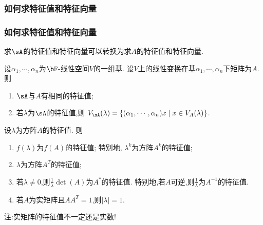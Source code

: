 \renewcommand{\mydate}{2025年05月15号\ 第二十一次课}


\subsubsection{如何求特征值和特征向量}
\begin{frame}\frametitle{如何求特征值和特征向量}
求$\sA$的特征值和特征向量可以转换为求$A$的特征值和特征向量.
\pp
\begin{proposition}
设$\alpha_1,\cdots,\alpha_n$为$\bF$-线性空间$V$的一组基.
\pp
设$V$上的线性变换在基$\alpha_1,\cdots,\alpha_n$下矩阵为$A$.
\pp
则
\begin{enumerate}
\item $\sA$与$A$有相同的特征值;
\pp
\item 若$\lambda$为$\sA$的特征值,则 $V_\sA(\lambda)=\{(\alpha_1,\cdots,\alpha_n)x\mid x\in V_A(\lambda)\}$.
\end{enumerate}
\end{proposition}
\pp
{}
\pp
\begin{proposition}
设$\lambda$为方阵$A$的特征值.
\pp
则
\begin{enumerate}
\item $f(\lambda)$为$f(A)$的特征值;
\pp
特别地, $\lambda^k$为方阵$A^k$的特征值;
\pp
\item $\lambda$为方阵$A^T$的特征值;
\pp
\item 若$\lambda\neq0$,则$\frac1\lambda\det(A)$为$A^*$的特征值.
\pp
特别地,若$A$可逆,则$\frac1\lambda$为$A^{-1}$的特征值.
\pp
\item 若$A$为实矩阵且$AA^T=1$,则$|\lambda|=1$.
\end{enumerate}
\end{proposition}
\pp
注:实矩阵的特征值不一定还是实数!
\end{frame}





